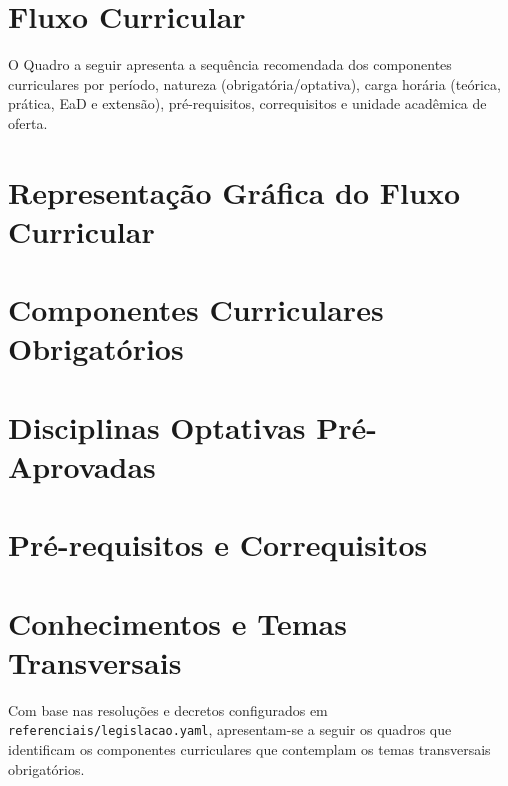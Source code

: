 \section{Fluxo Curricular}
\label{sec:fluxo}

O Quadro a seguir apresenta a sequência recomendada dos componentes
curriculares por período, natureza (obrigatória/optativa), carga horária
(teórica, prática, EaD e extensão), pré-requisitos, correquisitos e unidade
acadêmica de oferta.



\newpage
\section{Representação Gráfica do Fluxo Curricular}

\begin{landscape}

\end{landscape}

\newpage
\section{Componentes Curriculares Obrigatórios}


\section{Disciplinas Optativas Pré-Aprovadas}
\label{sec:optativas}


\section{Pré-requisitos e Correquisitos}


\section{Conhecimentos e Temas Transversais}

Com base nas resoluções e decretos configurados em
\texttt{referenciais/legislacao.yaml}, apresentam-se a seguir os quadros que
identificam os componentes curriculares que contemplam os temas
transversais obrigatórios.


